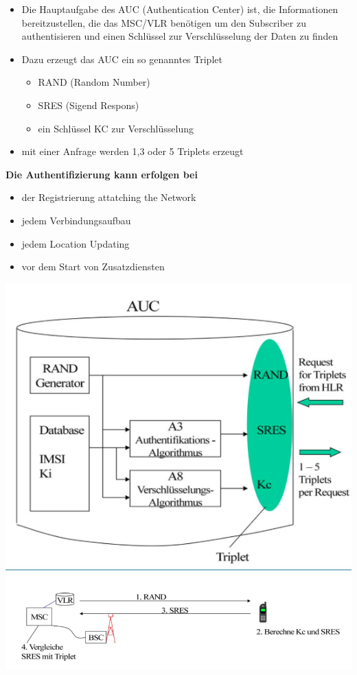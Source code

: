 \begin{minipage}{0.5 \linewidth}
\begin{itemize}
\item Die Hauptaufgabe des AUC (Authentication Center) ist, die Informationen bereitzustellen, die das MSC/VLR benötigen um den Subscriber zu authentisieren und einen Schlüssel zur Verschlüsselung der Daten zu finden
\item Dazu erzeugt das AUC ein so genanntes Triplet
\begin{itemize}
\item RAND (Random Number)
\item SRES (Sigend Respons)
\item ein Schlüssel KC zur Verschlüsselung 
\end{itemize}
\item mit einer Anfrage werden 1,3 oder 5 Triplets erzeugt
\end{itemize}
\vspace{0.5 cm}
\textbf{Die Authentifizierung kann erfolgen bei}
\begin{itemize}
\item der Registrierung {attatching the Network}
\item jedem Verbindungsaufbau
\item jedem Location Updating
\item vor dem Start von Zusatzdiensten
\end{itemize}
\end{minipage}
\begin{minipage}{0.5 \linewidth}
\includegraphics[width =  0.75 \linewidth]{./Pics/GSMAUC} 
\includegraphics[width =  \linewidth]{./Pics/GSMAuthentifizierung} 
\end{minipage}

